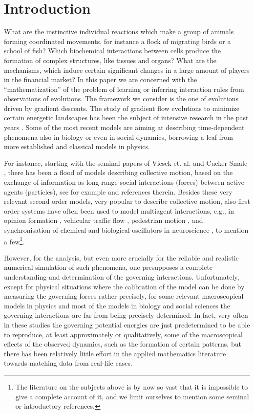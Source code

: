 \section{Introduction}

What are the instinctive individual reactions which make a group of animals forming coordinated movements, for instance a flock of migrating birds or a school of fish? Which biochemical interactions between cells produce the formation of complex structures, like tissues and organs? What are the mechanisms, which induce certain significant changes in a large amount of players in the financial market? 
In this paper we are concerned with the ``mathematization'' of the problem of learning or inferring interaction rules from observations of evolutions. The framework we consider is the one of  evolutions driven by gradient descents.
The study of gradient flow evolutions to minimize  certain energetic landscapes has been the subject of intensive research in the past years \cite{AGS}. Some of the most recent models are  aiming at describing time-dependent phenomena also in biology or even in social dynamics, borrowing a leaf from more established and classical  models in physics. 

{
 For instance, starting with the seminal papers of Vicsek et. al. \cite{VCBCS95} and Cucker-Smale \cite{CucSma07}, there has been a flood of models describing collective motion, based on the exchange of information as long-range social interactions (forces) between active agents (particles), %
see for example \cite{cafotove10} and references therein. Besides these very relevant second order models, very popular to describe collective motion, also first order systems have often been used to model multiagent interactions, e.g., in opinion formation \cite{kr00,hekr02}, vehicular traffic flow \cite{garavello2006traffic}, pedestrian motion \cite{crpito14}, and synchronisation of chemical and biological oscillators in neuroscience \cite{kuramoto2003chemical}, to mention a few\footnote{The literature on the subjects above is by now so vast that it is impossible to give a complete account of it, and we limit ourselves to mention some seminal or introductory references.}.}


However, for the analysis, but even more crucially for the reliable and realistic numerical simulation of such phenomena, one presupposes a complete understanding and determination of the governing { interactions}. Unfortunately, except for physical situations where the calibration of the model can be done by measuring the governing forces rather precisely, for some relevant macroscopical models in physics and most of the models in biology and social sciences the governing interactions are far from being precisely determined. In fact, very often in these studies the governing potential energies are just predetermined to be able to reproduce, at least approximately or qualitatively, some of the macroscopical effects of the observed dynamics, such as the formation of certain patterns, but there has been relatively little effort in the applied mathematics literature towards matching data from real-life cases. 

